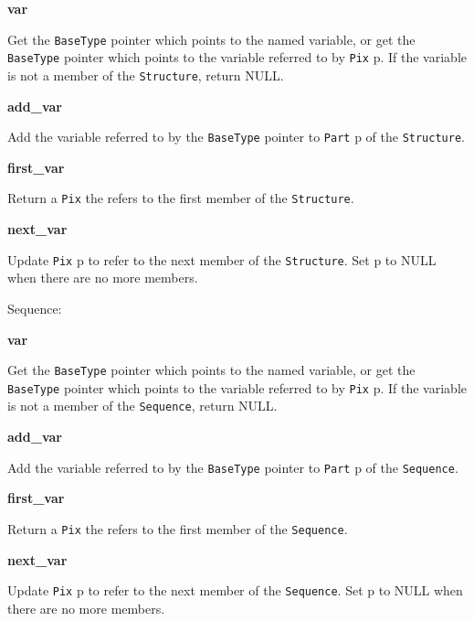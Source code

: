 \begin{description}

\item {\bf var}    

Get the {\tt BaseType} pointer which points to the named variable, or get the
{\tt BaseType} pointer which points to the variable referred to by {\tt Pix}
p. If the variable is not a member of the {\tt Structure}, return NULL.

\item {\bf add\_var}


Add the variable referred to by the {\tt BaseType} pointer to {\tt Part} p of
the {\tt Structure}.

\item {\bf first\_var}


Return a {\tt Pix} the refers to the first member of the {\tt Structure}.

\item {\bf next\_var}


Update {\tt Pix} p to refer to the next member of the {\tt Structure}. Set p
to NULL when there are no more members.

\end{description}

Sequence:

\begin{description}

\item {\bf var}    

Get the {\tt BaseType} pointer which points to the named variable, or get the
{\tt BaseType} pointer which points to the variable referred to by {\tt Pix}
p. If the variable is not a member of the {\tt Sequence}, return NULL.

\item {\bf add\_var}


Add the variable referred to by the {\tt BaseType} pointer to {\tt Part} p of
the {\tt Sequence}.

\item {\bf first\_var}


Return a {\tt Pix} the refers to the first member of the {\tt Sequence}.

\item {\bf next\_var}


Update {\tt Pix} p to refer to the next member of the {\tt Sequence}. Set p
to NULL when there are no more members.

\end{description}

